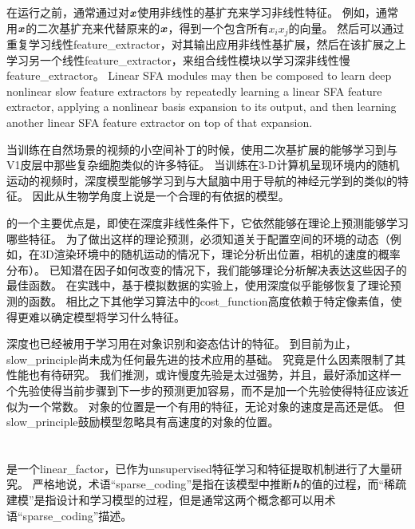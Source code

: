 在运行之前，通常通过对$\boldsymbol{\mathit{x}}$使用非线性的基扩充来学习非线性特征。
例如，通常用$\boldsymbol{\mathit{x}}$的二次基扩充来代替原来的$\boldsymbol{\mathit{x}}$，得到一个包含所有$x_ix_j$的向量。
然后可以通过重复学习线性\gls{feature_extractor}，对其输出应用非线性基扩展，然后在该扩展之上学习另一个线性\gls{feature_extractor}，来组合线性模块以学习深非线性慢\gls{feature_extractor}。
Linear SFA modules may then be composed to learn deep nonlinear slow feature extractors by repeatedly learning a linear SFA feature extractor, applying a nonlinear basis expansion to its output, and then learning another linear SFA feature extractor on top of that expansion.


当训练在自然场景的视频的小空间补丁的时候，使用二次基扩展的能够学习到与V1皮层中那些复杂细胞类似的许多特征\citep{Berkes-Wiskott-2005}。
当训练在3-D计算机呈现环境内的随机运动的视频时，深度模型能够学习到与大鼠脑中用于导航的神经元学到的类似的特征\citep{franzius2007slowness}。
因此从生物学角度上说是一个合理的有依据的模型。



的一个主要优点是，即使在深度非线性条件下，它依然能够在理论上预测能够学习哪些特征。
为了做出这样的理论预测，必须知道关于配置空间的环境的动态（例如，在3D渲染环境中的随机运动的情况下，理论分析出位置，相机的速度的概率分布）。
已知潜在因子如何改变的情况下，我们能够理论分析解决表达这些因子的最佳函数。
在实践中，基于模拟数据的实验上，使用深度似乎能够恢复了理论预测的函数。
相比之下其他学习算法中的\gls{cost_function}高度依赖于特定像素值，使得更难以确定模型将学习什么特征。


深度也已经被用于学习用在对象识别和姿态估计的特征\citep{Franzius2008}。
到目前为止，\gls{slow_principle}尚未成为任何最先进的技术应用的基础。
究竟是什么因素限制了其性能也有待研究。
我们推测，或许慢度先验是太过强势，并且，最好添加这样一个先验使得当前步骤到下一步的预测更加容易，而不是加一个先验使得特征应该近似为一个常数。
对象的位置是一个有用的特征，无论对象的速度是高还是低。 但\gls{slow_principle}鼓励模型忽略具有高速度的对象的位置。


\section{}
\label{sec:sparse_coding}


\citep{Olshausen+Field-1996}是一个\gls{linear_factor}，已作为\gls{unsupervised}特征学习和特征提取机制进行了大量研究。
严格地说，术语``\gls{sparse_coding}''是指在该模型中推断$\boldsymbol{\mathit{h}}$的值的过程，而``稀疏建模''是指设计和学习模型的过程，但是通常这两个概念都可以用术语``\gls{sparse_coding}''描述。

